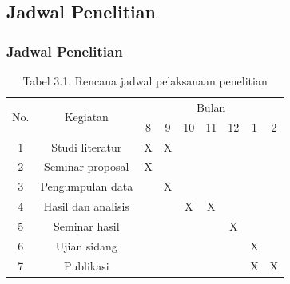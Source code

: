 \documentclass{beamer}
\begin{document}
\subsection{Jadwal Penelitian}
\begin{frame}
	\frametitle{Jadwal Penelitian}
		\begin{table}[htp]
			\centering
			\captionsetup{labelformat=empty}
			\caption{Tabel 3.1. Rencana jadwal pelaksanaan penelitian}
			\label{table:jadwal}
			\begin{tabular}{|c|c|ccccccc|}
				\hline
				\multirow{2}{*}{No.} & \multirow{2}{*}{Kegiatan} & \multicolumn{7}{c|}{Bulan}                                                                                                                            \\ \cline{3-9} 
				&                   & \multicolumn{1}{c|}{8} & \multicolumn{1}{c|}{9} & \multicolumn{1}{c|}{10} & \multicolumn{1}{c|}{11} & \multicolumn{1}{c|}{12} & \multicolumn{1}{c|}{1} &  2 \\ \hline 1
				& Studi literatur   & \multicolumn{1}{c|}{X} & \multicolumn{1}{c|}{X} & \multicolumn{1}{c|}{} & \multicolumn{1}{c|}{} & \multicolumn{1}{c|}{} & \multicolumn{1}{c|}{} &  \\ \hline 2
				& Seminar proposal    & \multicolumn{1}{c|}{X} & \multicolumn{1}{c|}{} & \multicolumn{1}{c|}{} & \multicolumn{1}{c|}{} & \multicolumn{1}{c|}{} & \multicolumn{1}{c|}{} &  \\ \hline 3
				& Pengumpulan data    & \multicolumn{1}{c|}{} & \multicolumn{1}{c|}{X} & \multicolumn{1}{c|}{} & \multicolumn{1}{c|}{} & \multicolumn{1}{c|}{} & \multicolumn{1}{c|}{} &  \\ \hline 4
				& Hasil dan analisis  & \multicolumn{1}{c|}{} & \multicolumn{1}{c|}{} & \multicolumn{1}{c|}{X} & \multicolumn{1}{c|}{X} & \multicolumn{1}{c|}{} & \multicolumn{1}{c|}{} &  \\ \hline 5
				& Seminar hasil       & \multicolumn{1}{c|}{} & \multicolumn{1}{c|}{} & \multicolumn{1}{c|}{} & \multicolumn{1}{c|}{} & \multicolumn{1}{c|}{X} & \multicolumn{1}{c|}{} &  \\ \hline 6
				& Ujian sidang        & \multicolumn{1}{c|}{} & \multicolumn{1}{c|}{} & \multicolumn{1}{c|}{} & \multicolumn{1}{c|}{} & \multicolumn{1}{c|}{} & \multicolumn{1}{c|}{X} &  \\ \hline 7
				& Publikasi           & \multicolumn{1}{c|}{} & \multicolumn{1}{c|}{} & \multicolumn{1}{c|}{} & \multicolumn{1}{c|}{} & \multicolumn{1}{c|}{} & \multicolumn{1}{c|}{X} & X  \\ \hline 
			\end{tabular}
		\end{table}
\end{frame}
\ThankYouFrame
\end{document}
